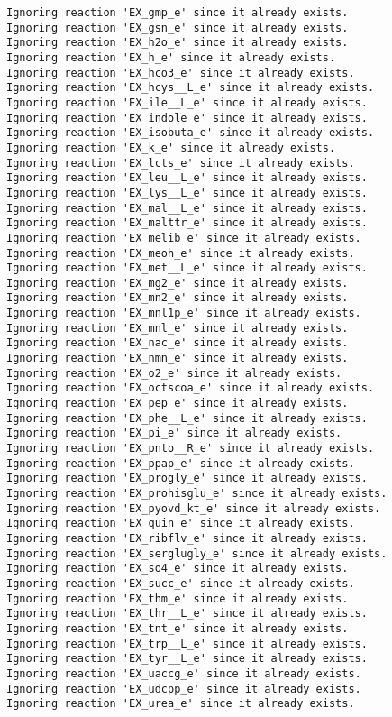 \documentclass[
  letterpaper,
  DIV=11,
  numbers=noendperiod]{scrartcl}
\begin{document}
\begin{verbatim}
Ignoring reaction 'EX_gmp_e' since it already exists.
Ignoring reaction 'EX_gsn_e' since it already exists.
Ignoring reaction 'EX_h2o_e' since it already exists.
Ignoring reaction 'EX_h_e' since it already exists.
Ignoring reaction 'EX_hco3_e' since it already exists.
Ignoring reaction 'EX_hcys__L_e' since it already exists.
Ignoring reaction 'EX_ile__L_e' since it already exists.
Ignoring reaction 'EX_indole_e' since it already exists.
Ignoring reaction 'EX_isobuta_e' since it already exists.
Ignoring reaction 'EX_k_e' since it already exists.
Ignoring reaction 'EX_lcts_e' since it already exists.
Ignoring reaction 'EX_leu__L_e' since it already exists.
Ignoring reaction 'EX_lys__L_e' since it already exists.
Ignoring reaction 'EX_mal__L_e' since it already exists.
Ignoring reaction 'EX_malttr_e' since it already exists.
Ignoring reaction 'EX_melib_e' since it already exists.
Ignoring reaction 'EX_meoh_e' since it already exists.
Ignoring reaction 'EX_met__L_e' since it already exists.
Ignoring reaction 'EX_mg2_e' since it already exists.
Ignoring reaction 'EX_mn2_e' since it already exists.
Ignoring reaction 'EX_mnl1p_e' since it already exists.
Ignoring reaction 'EX_mnl_e' since it already exists.
Ignoring reaction 'EX_nac_e' since it already exists.
Ignoring reaction 'EX_nmn_e' since it already exists.
Ignoring reaction 'EX_o2_e' since it already exists.
Ignoring reaction 'EX_octscoa_e' since it already exists.
Ignoring reaction 'EX_pep_e' since it already exists.
Ignoring reaction 'EX_phe__L_e' since it already exists.
Ignoring reaction 'EX_pi_e' since it already exists.
Ignoring reaction 'EX_pnto__R_e' since it already exists.
Ignoring reaction 'EX_ppap_e' since it already exists.
Ignoring reaction 'EX_progly_e' since it already exists.
Ignoring reaction 'EX_prohisglu_e' since it already exists.
Ignoring reaction 'EX_pyovd_kt_e' since it already exists.
Ignoring reaction 'EX_quin_e' since it already exists.
Ignoring reaction 'EX_ribflv_e' since it already exists.
Ignoring reaction 'EX_serglugly_e' since it already exists.
Ignoring reaction 'EX_so4_e' since it already exists.
Ignoring reaction 'EX_succ_e' since it already exists.
Ignoring reaction 'EX_thm_e' since it already exists.
Ignoring reaction 'EX_thr__L_e' since it already exists.
Ignoring reaction 'EX_tnt_e' since it already exists.
Ignoring reaction 'EX_trp__L_e' since it already exists.
Ignoring reaction 'EX_tyr__L_e' since it already exists.
Ignoring reaction 'EX_uaccg_e' since it already exists.
Ignoring reaction 'EX_udcpp_e' since it already exists.
Ignoring reaction 'EX_urea_e' since it already exists.

\end{verbatim}
\end{document}
